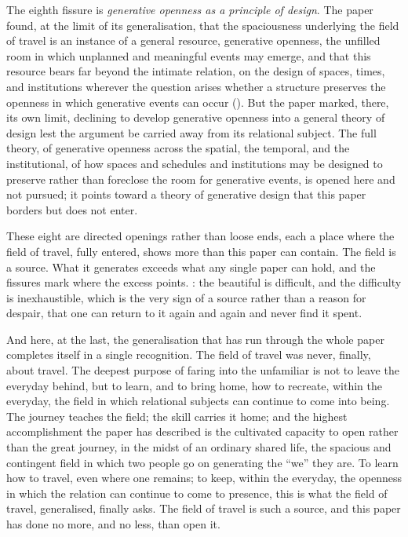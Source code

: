 The eighth fissure is \emph{generative openness as a principle of design}. The paper found, at the limit of its generalisation, that the spaciousness underlying the field of travel is an instance of a general resource, generative openness, the unfilled room in which unplanned and meaningful events may emerge, and that this resource bears far beyond the intimate relation, on the design of spaces, times, and institutions wherever the question arises whether a structure preserves the openness in which generative events can occur (). But the paper marked, there, its own limit, declining to develop generative openness into a general theory of design lest the argument be carried away from its relational subject. The full theory, of generative openness across the spatial, the temporal, and the institutional, of how spaces and schedules and institutions may be designed to preserve rather than foreclose the room for generative events, is opened here and not pursued; it points toward a theory of generative design that this paper borders but does not enter.

These eight are directed openings rather than loose ends, each a place where the field of travel, fully entered, shows more than this paper can contain. The field is a source. What it generates exceeds what any single paper can hold, and the fissures mark where the excess points. : the beautiful is difficult, and the difficulty is inexhaustible, which is the very sign of a source rather than a reason for despair, that one can return to it again and again and never find it spent.

And here, at the last, the generalisation that has run through the whole paper completes itself in a single recognition. The field of travel was never, finally, about travel. The deepest purpose of faring into the unfamiliar is not to leave the everyday behind, but to learn, and to bring home, how to recreate, within the everyday, the field in which relational subjects can continue to come into being. The journey teaches the field; the skill carries it home; and the highest accomplishment the paper has described is the cultivated capacity to open rather than the great journey, in the midst of an ordinary shared life, the spacious and contingent field in which two people go on generating the ``we'' they are. To learn how to travel, even where one remains; to keep, within the everyday, the openness in which the relation can continue to come to presence, this is what the field of travel, generalised, finally asks. The field of travel is such a source, and this paper has done no more, and no less, than open it.
